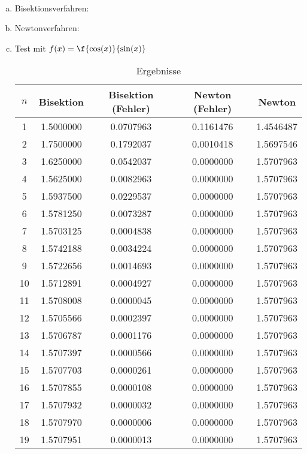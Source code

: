 \documentclass{mywork}
\begin{document}
\begin{aufgabe}~

	\begin{enumerate}[a)]
		\item
			Bisektionsverfahren:
			
		\item
			Newtonverfahren:
			
		\item
			Test mit $f(x) = \f{\cos(x)}{\sin(x)}$
			
			\begin{table}[h]
				\centering
				\caption{Ergebnisse}
				\begin{tabular}{c|c|c|c|c}
					$n$ & Bisektion & Bisektion (Fehler) & Newton (Fehler) & Newton \\ \hline
1 & 1.5000000 & 0.0707963 & 0.1161476 & 1.4546487\\
2 & 1.7500000 & 0.1792037 & 0.0010418 & 1.5697546\\
3 & 1.6250000 & 0.0542037 & 0.0000000 & 1.5707963\\
4 & 1.5625000 & 0.0082963 & 0.0000000 & 1.5707963\\
5 & 1.5937500 & 0.0229537 & 0.0000000 & 1.5707963\\
6 & 1.5781250 & 0.0073287 & 0.0000000 & 1.5707963\\
7 & 1.5703125 & 0.0004838 & 0.0000000 & 1.5707963\\
8 & 1.5742188 & 0.0034224 & 0.0000000 & 1.5707963\\
9 & 1.5722656 & 0.0014693 & 0.0000000 & 1.5707963\\
10 & 1.5712891 & 0.0004927 & 0.0000000 & 1.5707963\\
11 & 1.5708008 & 0.0000045 & 0.0000000 & 1.5707963\\
12 & 1.5705566 & 0.0002397 & 0.0000000 & 1.5707963\\
13 & 1.5706787 & 0.0001176 & 0.0000000 & 1.5707963\\
14 & 1.5707397 & 0.0000566 & 0.0000000 & 1.5707963\\
15 & 1.5707703 & 0.0000261 & 0.0000000 & 1.5707963\\
16 & 1.5707855 & 0.0000108 & 0.0000000 & 1.5707963\\
17 & 1.5707932 & 0.0000032 & 0.0000000 & 1.5707963\\
18 & 1.5707970 & 0.0000006 & 0.0000000 & 1.5707963\\
19 & 1.5707951 & 0.0000013 & 0.0000000 & 1.5707963\\

\end{tabular}
\end{table}
\end{enumerate}
\end{aufgabe}
\end{document}
